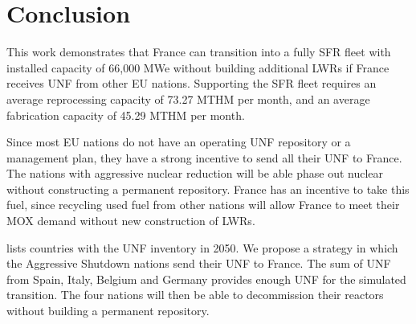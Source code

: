 \section{Conclusion}

This work demonstrates that France can transition into
a fully \gls{SFR} fleet with installed capacity of 66,000 \gls{MWe} without
building additional \glspl{LWR}
if France receives \gls{UNF} from other \gls{EU} nations.
Supporting the \gls{SFR} fleet requires an average 
reprocessing capacity of 73.27 \gls{MTHM} per month,
and an average fabrication capacity of 45.29 \gls{MTHM} per month.


Since most \gls{EU} nations do not have an operating \gls{UNF}
repository or a management plan, they have a strong incentive
to send all their \gls{UNF} to France. The nations
with aggressive nuclear reduction will be able phase out nuclear
without constructing a permanent repository. France has an
incentive to take this fuel, since recycling used fuel from
other nations will allow France to meet their MOX demand
without new construction of \glspl{LWR}.

 lists countries with the \gls{UNF} inventory
in 2050. We propose a strategy in which 
the Aggressive Shutdown nations send their \gls{UNF} to France.
The sum of \gls{UNF} from Spain, Italy, Belgium and Germany
provides enough \gls{UNF} for the simulated transition.
The four nations will then be able to decommission
their reactors without building a permanent repository. 

